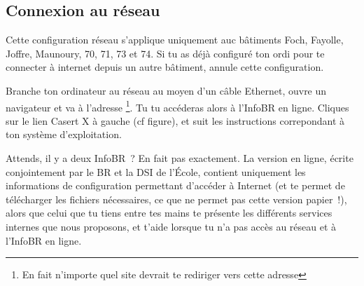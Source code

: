 
\subsection{Connexion au réseau}

Cette configuration réseau s'applique uniquement auc bâtiments Foch, Fayolle, Joffre, Maunoury, 70, 71, 73 et 74. Si tu as déjà configuré ton ordi pour te connecter à internet depuis un autre bâtiment, annule cette configuration.

Branche ton ordinateur au réseau au moyen d'un câble Ethernet, ouvre un navigateur et va à l'adresse \footnote{En fait n'importe quel site devrait te rediriger vers cette adresse}. Tu tu accéderas alors à l'InfoBR en ligne. Cliques sur le lien Casert X à gauche (cf figure), et suit les instructions correpondant à ton système d'exploitation.

Attends, il y a deux InfoBR~? En fait pas exactement. La version en ligne, écrite conjointement par le BR et la DSI de l'École,  contient uniquement les informations de configuration permettant d'accéder à Internet (et te permet de télécharger les fichiers nécessaires, ce que ne permet pas cette version papier~!), alors que celui que tu tiens entre tes mains te présente les différents services internes que nous proposons, et t'aide lorsque tu n'a pas accès au réseau et à l'InfoBR en ligne.

